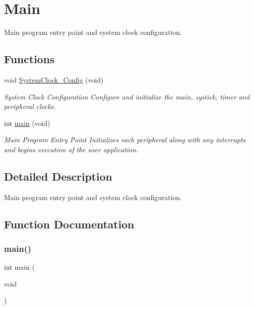 \hypertarget{group___s_d___main}{}\section{Main}
\label{group___s_d___main}


Main program entry point and system clock configuration.  


\subsection*{Functions}
\begin{DoxyCompactItemize}
\item 
\mbox{\label{group___s_d___main_ga70af21c671abfcc773614a9a4f63d920}} 
void \mbox{\hyperlink{group___s_d___main_ga70af21c671abfcc773614a9a4f63d920}{System\+Clock\+\_\+\+Config}} (void)
\begin{DoxyCompactList}\small\item\em System Clock Configuration Configure and initialize the main, systick, timer and peripheral clocks. \end{DoxyCompactList}\item 
int \mbox{\hyperlink{group___s_d___main_ga840291bc02cba5474a4cb46a9b9566fe}{main}} (void)
\begin{DoxyCompactList}\small\item\em Main Program Entry Point Initializes each peripheral along with any interrupts and begins execution of the user application. \end{DoxyCompactList}\end{DoxyCompactItemize}


\subsection{Detailed Description}
Main program entry point and system clock configuration. 



\subsection{Function Documentation}
\mbox{\label{group___s_d___main_ga840291bc02cba5474a4cb46a9b9566fe}} 
\subsubsection{\texorpdfstring{main()}{main()}}
{\footnotesize\ttfamily int main (\begin{DoxyParamCaption}\item[{void}]{ }\end{DoxyParamCaption})}



